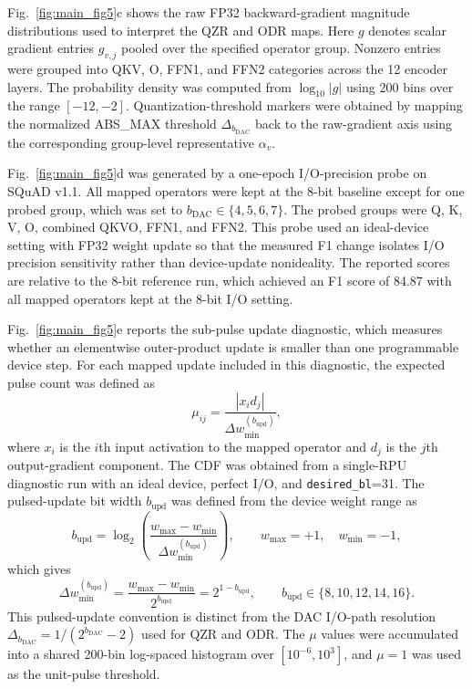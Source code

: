 \documentclass[fleqn,10pt]{wlscirep}
\begin{document}
Fig.~\ref{fig:main_fig5}c shows the raw FP32 backward-gradient magnitude distributions used to interpret the QZR and ODR maps. 
Here \(g\) denotes scalar gradient entries \(g_{v,j}\) pooled over the specified operator group. 
Nonzero entries were grouped into QKV, O, FFN1, and FFN2 categories across the 12 encoder layers. 
The probability density was computed from \(\log_{10}|g|\) using 200 bins over the range \([-12,-2]\). 
Quantization-threshold markers were obtained by mapping the normalized ABS\_MAX threshold \(\Delta_{b_{\mathrm{DAC}}}\) back to the raw-gradient axis using the corresponding group-level representative \(\alpha_v\).

Fig.~\ref{fig:main_fig5}d was generated by a one-epoch I/O-precision probe on SQuAD v1.1. 
All mapped operators were kept at the 8-bit baseline except for one probed group, which was set to \(b_{\mathrm{DAC}}\in\{4,5,6,7\}\). 
The probed groups were Q, K, V, O, combined QKVO, FFN1, and FFN2. 
This probe used an ideal-device setting with FP32 weight update so that the measured F1 change isolates I/O precision sensitivity rather than device-update nonideality. 
The reported scores are relative to the 8-bit reference run, which achieved an F1 score of 84.87 with all mapped operators kept at the 8-bit I/O setting.

Fig.~\ref{fig:main_fig5}e reports the sub-pulse update diagnostic, which measures whether an elementwise outer-product update is smaller than one programmable device step. 
For each mapped update included in this diagnostic, the expected pulse count was defined as
\begin{equation}
\mu_{ij}
=
\frac{|x_i d_j|}{\Delta w_{\min}^{(b_{\mathrm{upd}})}},
\label{eq:mu_def}
\end{equation}
where \(x_i\) is the \(i\)th input activation to the mapped operator and \(d_j\) is the \(j\)th output-gradient component. 
The CDF was obtained from a single-RPU diagnostic run with an ideal device, perfect I/O, and \texttt{desired\_bl}=31. 
The pulsed-update bit width \(b_{\mathrm{upd}}\) was defined from the device weight range as
\[
b_{\mathrm{upd}}
=
\log_2
\left(
\frac{w_{\max}-w_{\min}}{\Delta w_{\min}^{(b_{\mathrm{upd}})}}
\right),
\qquad
w_{\max}=+1,\quad w_{\min}=-1,
\]
which gives
\[
\Delta w_{\min}^{(b_{\mathrm{upd}})}
=
\frac{w_{\max}-w_{\min}}{2^{b_{\mathrm{upd}}}}
=
2^{1-b_{\mathrm{upd}}},
\qquad
b_{\mathrm{upd}}\in\{8,10,12,14,16\}.
\]
This pulsed-update convention is distinct from the DAC I/O-path resolution \(\Delta_{b_{\mathrm{DAC}}}=1/(2^{b_{\mathrm{DAC}}}-2)\) used for QZR and ODR. 
The \(\mu\) values were accumulated into a shared 200-bin log-spaced histogram over \([10^{-6},10^{3}]\), and \(\mu=1\) was used as the unit-pulse threshold.
\end{document}
